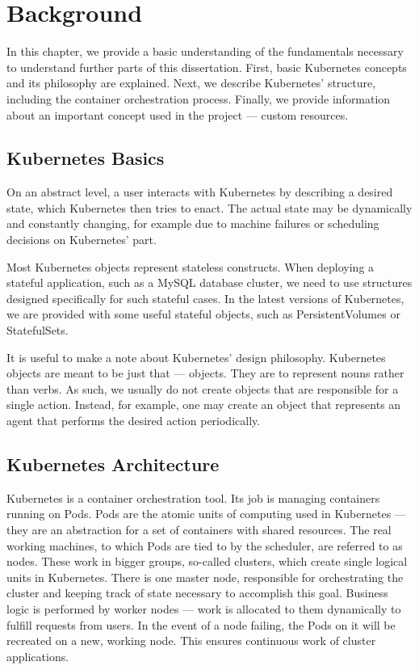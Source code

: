 \chapter{Background}

In this chapter, we provide a basic understanding of the fundamentals necessary to understand
further parts of this dissertation. First, basic Kubernetes concepts and its philosophy are
explained. Next, we describe Kubernetes’ structure, including the container orchestration process.
Finally, we provide information about an important concept used in the project --- custom resources.

\section{Kubernetes Basics}
On an abstract level, a user interacts with Kubernetes by describing a desired state, which
Kubernetes then tries to enact. The actual state may be dynamically and constantly changing, for
example due to machine failures or scheduling decisions on Kubernetes' part. 

Most Kubernetes objects represent stateless constructs. When deploying a stateful application, such as a
MySQL database cluster, we need to use structures designed specifically for such stateful cases. In
the latest versions of Kubernetes, we are provided with some useful stateful objects, such as
PersistentVolumes or StatefulSets.

It is useful to make a note about Kubernetes’ design philosophy.
Kubernetes objects are meant to be just that --- objects. They are to represent nouns rather than
verbs. As such, we usually do not create objects that are responsible for a single action. Instead,
for example, one may create an object that represents an agent that performs the desired action
periodically.

\section{Kubernetes Architecture}

Kubernetes is a container orchestration tool. Its job is managing containers running on Pods. Pods
are the atomic units of computing used in Kubernetes --- they are an abstraction for a set of
containers with shared resources. The real working machines, to which Pods are tied to by the
scheduler, are referred to as nodes. These work in bigger groups, so-called clusters, which
create single logical units in Kubernetes. There is one master node, responsible for orchestrating
the cluster and keeping track of state necessary to accomplish this goal. Business logic is
performed by worker nodes --- work is allocated to them dynamically to fulfill requests from users.
In the event of a node failing, the Pods on it will be recreated on a new,
working node. This ensures continuous work of cluster applications.

